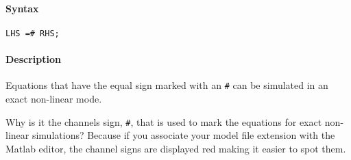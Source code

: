 


	\paragraph{Syntax}\label{syntax}

\begin{verbatim}
LHS =# RHS;
\end{verbatim}

\paragraph{Description}\label{description}

Equations that have the equal sign marked with an \texttt{\#} can be
simulated in an exact non-linear mode.

Why is it the channels sign, \texttt{\#}, that is used to mark the
equations for exact non-linear simulations? Because if you associate
your model file extension with the Matlab editor, the channel signs are
displayed red making it easier to spot them.



